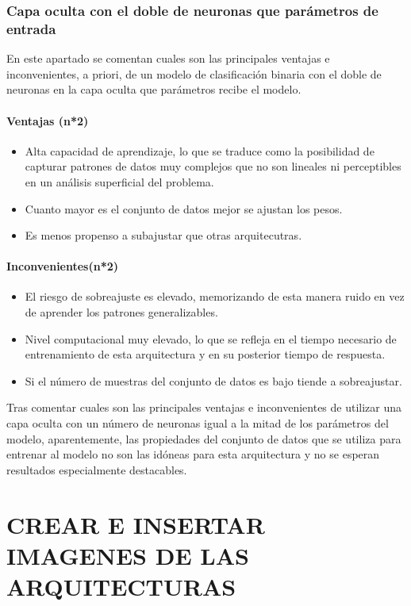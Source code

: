 \subsubsection{Capa oculta con el doble de neuronas que parámetros de entrada}\label{sec:VIBIN98}
En este apartado se comentan cuales son las principales ventajas e inconvenientes, a priori, de un modelo de clasificación binaria con el doble de neuronas en la capa oculta que parámetros recibe el modelo.

\paragraph{Ventajas (n*2)}
\begin{itemize}
	\item Alta capacidad de aprendizaje, lo que se traduce como la posibilidad de capturar patrones de datos muy complejos que no son lineales ni perceptibles en un análisis superficial del problema.
	\item Cuanto mayor es el conjunto de datos mejor se ajustan los pesos.
	\item Es menos propenso a subajustar que otras arquitecutras.
\end{itemize}
\paragraph{Inconvenientes(n*2)}
\begin{itemize}
	\item El riesgo de sobreajuste es elevado, memorizando de esta manera ruido en vez de aprender los patrones generalizables.
	\item Nivel computacional muy elevado, lo que se refleja en el tiempo necesario de entrenamiento de esta arquitectura y en su posterior tiempo de respuesta.
	\item Si el número de muestras del conjunto de datos es bajo tiende a sobreajustar.
\end{itemize}

Tras comentar cuales son las principales ventajas e inconvenientes de utilizar una capa oculta con un número de neuronas igual a la mitad de los parámetros del modelo, aparentemente, las propiedades del conjunto de datos que se utiliza para entrenar al modelo no son las idóneas para esta arquitectura y no se esperan resultados especialmente destacables.

\section{CREAR E INSERTAR IMAGENES DE LAS ARQUITECTURAS}


